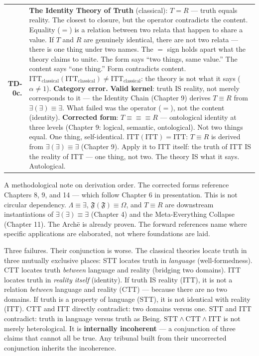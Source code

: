 \documentclass[10pt, openany, oneside]{book}
\begin{document}
{\begin{tabular}{r p{}}
\textbf{TD-0c.} & \textbf{The Identity Theory of Truth} (classical): $T = R$ --- truth equals reality. The closest to closure, but the operator contradicts the content. Equality ($=$) is a relation between two relata that happen to share a value. If $T$ and $R$ are genuinely identical, there are not two relata --- there is one thing under two names. The $=$ sign holds apart what the theory claims to unite. The form says ``two things, same value.'' The content says ``one thing.'' Form contradicts content. $\text{ITT}_{\text{classical}}(\text{ITT}_{\text{classical}}) \neq \text{ITT}_{\text{classical}}$: the theory is not what it says ($\alpha \neq 1$). \textbf{Category error.} \textbf{Valid kernel}: truth IS reality, not merely corresponds to it --- the Identity Chain (Chapter 9) derives $T \equiv R$ from $\exists(\exists) \equiv \exists$. What failed was the operator ($=$), not the content (identity). \textbf{Corrected form}: $T \equiv\!\equiv\!\equiv R$ --- ontological identity at three levels (Chapter 9: logical, semantic, ontological). Not two things equal. One thing, self-identical. $\text{ITT}(\text{ITT}) = \text{ITT}$: $T \equiv R$ is derived from $\exists(\exists) \equiv \exists$ (Chapter 9). Apply it to ITT itself: the truth of ITT IS the reality of ITT --- one thing, not two. The theory IS what it says. Autological. \\[0.3em]
\end{tabular}
}

\vspace{0.8em}

\noindent A methodological note on derivation order. The corrected forms reference Chapters 8, 9, and 14 --- which follow Chapter 6 in presentation. This is not circular dependency. $\Lambda \equiv \exists$, $\mathfrak{F}(\mathfrak{F}) \equiv \Omega$, and $T \equiv R$ are downstream instantiations of $\exists(\exists) \equiv \exists$ (Chapter 4) and the Meta-Everything Collapse (Chapter 11). The Arch\={e} is already proven. The forward references name where specific applications are elaborated, not where foundations are laid.

\newpage

\noindent Three failures. Their conjunction is worse. The classical theories locate truth in three mutually exclusive places: STT locates truth in \textit{language} (well-formedness). CTT locates truth \textit{between} language and reality (bridging two domains). ITT locates truth in \textit{reality itself} (identity). If truth IS reality (ITT), it is not a relation \textit{between} language and reality (CTT) --- because there are no two domains. If truth is a property of language (STT), it is not identical with reality (ITT). CTT and ITT directly contradict: two domains versus one. STT and ITT contradict: truth in language versus truth as Being. $\text{STT} \wedge \text{CTT} \wedge \text{ITT}$ is not merely heterological. It is \textbf{internally incoherent} --- a conjunction of three claims that cannot all be true. Any tribunal built from their uncorrected conjunction inherits the incoherence.
\end{document}
